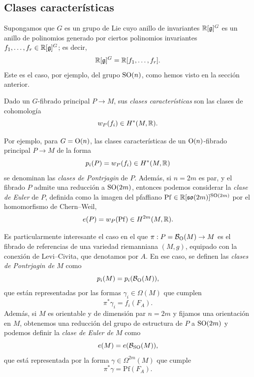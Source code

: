 \documentclass[11pt,a4paper]{amsbook}
\theoremstyle{remark} \newtheorem{rmk}[subsection]{Observación}
\theoremstyle{definition} \newtheorem{defn}[subsection]{Definición}
\theoremstyle{definition} \newtheorem{ex}[subsection]{Ejemplo}
\theoremstyle{definition} \newtheorem{ej}[subsection]{Ejercicio}
\begin{document}
\subsection{Clases características} Supongamos que $G$ es un grupo de Lie cuyo anillo de invariantes $\mathbb R[\mathfrak{g}]^G$ es un anillo de polinomios generado por ciertos polinomios invariantes $f_1,\dots,f_r\in \mathbb R[\mathfrak{g}]^G$; es decir,
\begin{equation*}
\mathbb R[\mathfrak{g}]^G=\mathbb R[f_1,\dots,f_r].
\end{equation*}
Este es el caso, por ejemplo, del grupo $\operatorname{SO}(n)$, como hemos visto en la sección anterior.

Dado un $G$-fibrado principal $P\rightarrow M$, sus \emph{clases características} son las clases de cohomología
\begin{equation*}
w_P(f_i) \in H^*(M,\mathbb R).
\end{equation*}

Por ejemplo, para $G=\operatorname{O}(n)$, las clases características de un $\operatorname{O}(n)$-fibrado principal $P\rightarrow M$ de la forma
\begin{equation*}
p_i(P)=w_P(f_i) \in H^*(M,\mathbb R)
\end{equation*}
se denominan las \emph{clases de Pontrjagin} de $P$. Además, si $n=2m$ es par, y el fibrado $P$ admite una reducción a $\operatorname{SO}(2m)$, entonces podemos considerar la \emph{clase de Euler} de $P$, definida como la imagen del pfaffiano $\mathrm{Pf}\in \mathbb R[\mathfrak{so}(2m)]^{\operatorname{SO}(2m)}$ por el homomorfismo de Chern--Weil,
\begin{equation*}
e(P)= w_P(\mathrm{Pf}) \in H^{2m}(M,\mathbb R).
\end{equation*}

Es particularmente interesante el caso en el que $\pi:P=\mathcal{B}_{\operatorname{O}}(M)\rightarrow M$ es el fibrado de referencias de una variedad riemanniana $(M,g)$, equipado con la conexión de Levi--Civita, que denotamos por $A$. En ese caso, se definen las \emph{clases de Pontrjagin de $M$} como
\begin{equation*}
p_i(M) = p_i(\mathcal{B}_{\operatorname{O}}(M)),
\end{equation*}
que están representadas por las formas $\gamma_i \in \Omega(M)$ que cumplen
\begin{equation*}
\pi^* \gamma_i = f_i(F_A).
\end{equation*}
Además, si $M$ es orientable y de dimensión par $n=2m$ y fijamos una orientación en $M$, obtenemos una reducción del grupo de estructura de $P$ a $\operatorname{SO}(2m)$ y podemos definir la \emph{clase de Euler de $M$} como
\begin{equation*}
e(M) = e(\mathcal{B}_{\operatorname{SO}}(M)),
\end{equation*}
que está representada por la forma $\gamma \in \Omega^{2m}(M)$ que cumple
\begin{equation*}
\pi^* \gamma= \mathrm{Pf}(F_A).
\end{equation*}
\end{document}
